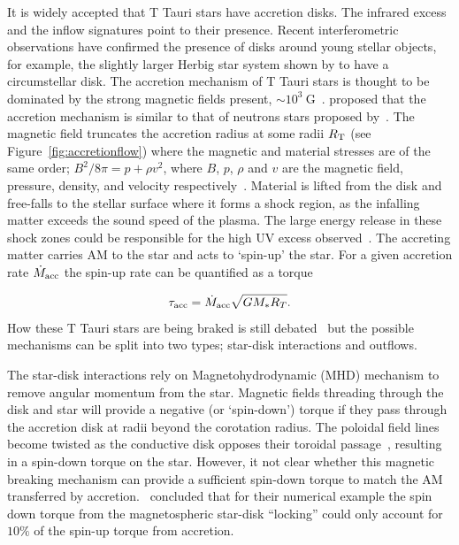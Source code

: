 \documentclass[fleqn,usenatbib]{mnras}
\begin{document}
It is widely accepted that T Tauri stars have accretion disks. The infrared excess and the inflow signatures point to their presence. Recent interferometric observations have confirmed the presence of disks around young stellar objects, for example, the slightly larger Herbig star system shown by \cite{2012ApJ...752...11K} to have a circumstellar disk. The accretion mechanism of T Tauri stars is thought to be dominated by the strong magnetic fields present, $\sim 10^{3}~\textrm{G}$~\citep{2012MNRAS.426.2901K}. \citet{1991ApJ...370L..39K} proposed that the accretion mechanism is similar to that of neutrons stars proposed by~\citet{1977ApJ...217..578G}. The magnetic field truncates the accretion radius at some radii $R_{\rm T}$ (see Figure~\ref{fig:accretionflow}) where the magnetic and material stresses are of the same order; $B^2/8\pi = p + \rho v^2$, where $B$, $p$, $\rho$ and $v$ are the magnetic field, pressure, density, and velocity respectively~\citep{Romanova:2002hc}. Material is lifted from the disk and free-falls to the stellar surface where it forms a shock region, as the infalling matter exceeds the sound speed of the plasma. The large energy release in these shock zones could be responsible for the high UV excess observed~\citep{2009A&A...508.1117Z}. The accreting matter carries AM to the star and acts to `spin-up' the star. For a given accretion rate $\dot{M}_{\rm acc}$ the spin-up rate can be quantified as a torque~\citep{2005ApJ...632L.135M}

\begin{equation}
    \tau_{\rm acc} = \dot{M}_{\rm acc}\sqrt{GM_{\ast}R_{T}}.
    \label{eq:accretion_torque}
\end{equation}
How these T Tauri stars are being braked is still debated~\citep{Hartmann:2016gu} but the possible mechanisms can be split into two types; star-disk interactions and outflows. 

The star-disk interactions rely on Magnetohydrodynamic (MHD) mechanism to remove angular momentum from the star. Magnetic fields threading through the disk and star will provide a negative (or `spin-down') torque if they pass through the accretion disk at radii beyond the corotation radius. The poloidal field lines become twisted as the conductive disk opposes their toroidal passage~\citep{Uzdensky:2002dg}, resulting in a spin-down torque on the star.  However, it not clear whether this magnetic breaking mechanism can provide a sufficient spin-down torque to match the AM transferred by accretion.~\citet{2009A&A...508.1117Z} concluded that for their numerical example the spin down torque from the magnetospheric star-disk ``locking'' could only account for $10\%$ of the spin-up torque from accretion.
\end{document}
